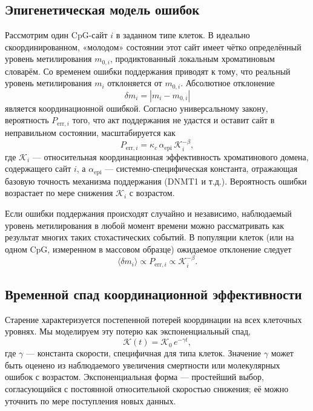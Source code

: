 \documentclass[12pt,a4paper]{article}
\newcommand{\REL}{\mathcal{K}}          %
\begin{document}
	\subsection{Эпигенетическая модель ошибок}
	Рассмотрим один CpG-сайт \(i\) в заданном типе клеток. В идеально скоординированном, «молодом» состоянии этот сайт имеет чётко определённый уровень метилирования \(m_{0,i}\), продиктованный локальным хроматиновым словарём. Со временем ошибки поддержания приводят к тому, что реальный уровень метилирования \(m_i\) отклоняется от \(m_{0,i}\). Абсолютное отклонение
	\[
	\delta m_i = |m_i - m_{0,i}|
	\]
	является координационной ошибкой. Согласно универсальному закону, вероятность \(P_{\mathrm{err},i}\) того, что акт поддержания не удастся и оставит сайт в неправильном состоянии, масштабируется как
	\begin{equation}
		P_{\mathrm{err},i} = \kappa_c \, \alpha_{\mathrm{epi}} \, \REL_i^{-\beta},
		\label{eq:perr}
	\end{equation}
	где \(\REL_i\) — относительная координационная эффективность хроматинового домена, содержащего сайт \(i\), а \(\alpha_{\mathrm{epi}}\) — системно-специфическая константа, отражающая базовую точность механизма поддержания (DNMT1 и т.д.). Вероятность ошибки возрастает по мере снижения \(\REL_i\) с возрастом.
	
	Если ошибки поддержания происходят случайно и независимо, наблюдаемый уровень метилирования в любой момент времени можно рассматривать как результат многих таких стохастических событий. В популяции клеток (или на одном CpG, измеренном в массовом образце) ожидаемое отклонение следует
	\[
	\langle \delta m_i \rangle \propto P_{\mathrm{err},i} \propto \REL_i^{-\beta}.
	\]
	
	\subsection{Временной спад координационной эффективности}
	Старение характеризуется постепенной потерей координации на всех клеточных уровнях. Мы моделируем эту потерю как экспоненциальный спад,
	\begin{equation}
		\REL(t) = \REL_0 \, e^{-\gamma t},
		\label{eq:Kdecay}
	\end{equation}
	где \(\gamma\) — константа скорости, специфичная для типа клеток. Значение \(\gamma\) может быть оценено из наблюдаемого увеличения смертности или молекулярных ошибок с возрастом. Экспоненциальная форма — простейший выбор, согласующийся с постоянной относительной скоростью снижения; её можно уточнить по мере поступления новых данных.
	
\end{document}
